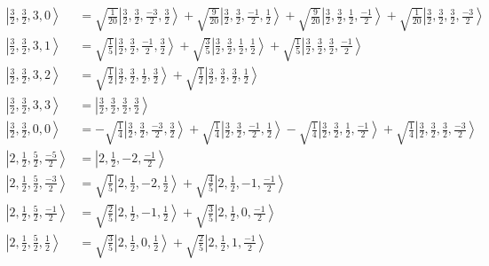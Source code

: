 \documentclass{report}
\newcommand{\ket}[1]{\left| #1 \right>} %
\begin{document}
\begin{align*}
\ket{ \frac{3}{2} ,  \frac{3}{2} ,  3 ,  0  } &=  \sqrt{  \frac{1}{20}  } \ket{ \frac{3}{2} ,  \frac{3}{2} ,  \frac{-3}{2} ,  \frac{3}{2}  } + \sqrt{  \frac{9}{20}  } \ket{ \frac{3}{2} ,  \frac{3}{2} ,  \frac{-1}{2} ,  \frac{1}{2}  } + \sqrt{  \frac{9}{20}  } \ket{ \frac{3}{2} ,  \frac{3}{2} ,  \frac{1}{2} ,  \frac{-1}{2}  } + \sqrt{  \frac{1}{20}  } \ket{ \frac{3}{2} ,  \frac{3}{2} ,  \frac{3}{2} ,  \frac{-3}{2}  } \\
\ket{ \frac{3}{2} ,  \frac{3}{2} ,  3 ,  1  } &=  \sqrt{  \frac{1}{5}  } \ket{ \frac{3}{2} ,  \frac{3}{2} ,  \frac{-1}{2} ,  \frac{3}{2}  } + \sqrt{  \frac{3}{5}  } \ket{ \frac{3}{2} ,  \frac{3}{2} ,  \frac{1}{2} ,  \frac{1}{2}  } + \sqrt{  \frac{1}{5}  } \ket{ \frac{3}{2} ,  \frac{3}{2} ,  \frac{3}{2} ,  \frac{-1}{2}  } \\
\ket{ \frac{3}{2} ,  \frac{3}{2} ,  3 ,  2  } &=  \sqrt{  \frac{1}{2}  } \ket{ \frac{3}{2} ,  \frac{3}{2} ,  \frac{1}{2} ,  \frac{3}{2}  } + \sqrt{  \frac{1}{2}  } \ket{ \frac{3}{2} ,  \frac{3}{2} ,  \frac{3}{2} ,  \frac{1}{2}  } \\
\ket{ \frac{3}{2} ,  \frac{3}{2} ,  3 ,  3  } &=  \ket{ \frac{3}{2} ,  \frac{3}{2} ,  \frac{3}{2} ,  \frac{3}{2}  } \\
\ket{ \frac{3}{2} ,  \frac{3}{2} ,  0 ,  0  } &=  - \sqrt{  \frac{1}{4}  } \ket{ \frac{3}{2} ,  \frac{3}{2} ,  \frac{-3}{2} ,  \frac{3}{2}  } + \sqrt{  \frac{1}{4}  } \ket{ \frac{3}{2} ,  \frac{3}{2} ,  \frac{-1}{2} ,  \frac{1}{2}  } - \sqrt{  \frac{1}{4}  } \ket{ \frac{3}{2} ,  \frac{3}{2} ,  \frac{1}{2} ,  \frac{-1}{2}  } + \sqrt{  \frac{1}{4}  } \ket{ \frac{3}{2} ,  \frac{3}{2} ,  \frac{3}{2} ,  \frac{-3}{2}  } \\
\ket{ 2 ,  \frac{1}{2} ,  \frac{5}{2} ,  \frac{-5}{2}  } &=  \ket{ 2 ,  \frac{1}{2} ,  -2 ,  \frac{-1}{2}  } \\
\ket{ 2 ,  \frac{1}{2} ,  \frac{5}{2} ,  \frac{-3}{2}  } &=  \sqrt{  \frac{1}{5}  } \ket{ 2 ,  \frac{1}{2} ,  -2 ,  \frac{1}{2}  } + \sqrt{  \frac{4}{5}  } \ket{ 2 ,  \frac{1}{2} ,  -1 ,  \frac{-1}{2}  } \\
\ket{ 2 ,  \frac{1}{2} ,  \frac{5}{2} ,  \frac{-1}{2}  } &=  \sqrt{  \frac{2}{5}  } \ket{ 2 ,  \frac{1}{2} ,  -1 ,  \frac{1}{2}  } + \sqrt{  \frac{3}{5}  } \ket{ 2 ,  \frac{1}{2} ,  0 ,  \frac{-1}{2}  } \\
\ket{ 2 ,  \frac{1}{2} ,  \frac{5}{2} ,  \frac{1}{2}  } &=  \sqrt{  \frac{3}{5}  } \ket{ 2 ,  \frac{1}{2} ,  0 ,  \frac{1}{2}  } + \sqrt{  \frac{2}{5}  } \ket{ 2 ,  \frac{1}{2} ,  1 ,  \frac{-1}{2}  } \\

\end{align*}
\end{document}
